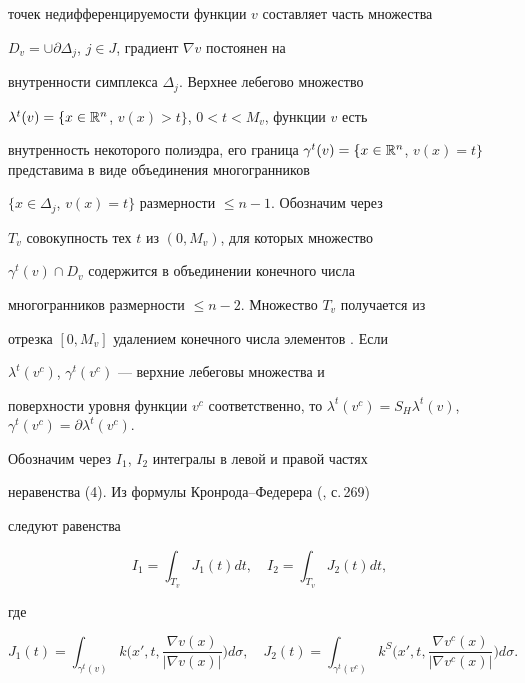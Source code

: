 точек недифференцируемости функции $v$ составляет часть множества 


$D_v=\cup\partial\Delta_j$, $j\in J$, градиент $\nabla v$ постоянен на 


внутренности симплекса $\Delta_j$. Верхнее лебегово множество 


$\lambda^t(v)=\{x\in\Bbb R^n$, $v(x)>t\}$, $0<t<M_v$, функции $v$ есть 


внутренность некоторого полиэдра, его граница $\gamma^t(v)=\{x\in\Bbb 


R^n$, $v(x)=t\}$ представима в виде объединения многогранников 


$\{x\in\Delta_j$, $v(x)=t\}$ размерности $\le n-1$. Обозначим через 


$T_v$ совокупность тех $t$ из $(0,M_v)$, для которых множество 


$\gamma^t(v)\cap D_v$ содержится в объединении конечного числа 


многогранников размерности $\le n-2$. Множество $T_v$ получается из 


отрезка $[0,M_v]$ удалением конечного числа элементов \cite{8}. Если 


$\lambda^t(v^c)$, $\gamma^t(v^c)$ --- верхние лебеговы множества и 


поверхности уровня функции $v^c$ соответственно, то $\lambda^t(v^c)=S_H 


\lambda^t(v)$, $\gamma^t(v^c)=\partial\lambda^t(v^c)$. 


 


Обозначим через $I_1$, $I_2$ интегралы в левой и правой частях 


неравенства (4). Из формулы Кронрода--Федерера (\cite{11}, с.\,269) 


следуют равенства 


$$ 


I_1=\int_{T_v}J_1(t)d t,\quad I_2=\int_{T_v}J_2(t)d t, 


$$ 


где 


\begin{equation} 


J_1(t)=\int_{\gamma^t(v)}k\bigg(x',t, 


\frac{\nabla v(x)}{|\nabla v(x)|}\bigg)d\sigma,\quad 


J_2(t)=\int_{\gamma^t(v^c)}k^S\bigg(x',t, 


\frac{\nabla v^c(x)}{|\nabla v^c(x)|}\bigg)d\sigma. 


\end{equation} 


